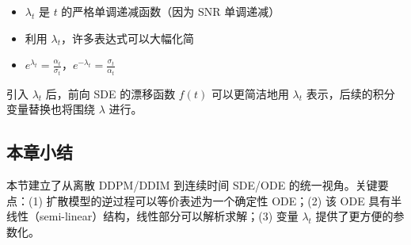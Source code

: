\begin{itemize}
    \item $\lambda_t$ 是 $t$ 的严格单调递减函数（因为 SNR 单调递减）
    \item 利用 $\lambda_t$，许多表达式可以大幅化简
    \item $e^{\lambda_t} = \frac{\alpha_t}{\sigma_t}$，$e^{-\lambda_t} = \frac{\sigma_t}{\alpha_t}$
\end{itemize}

引入 $\lambda_t$ 后，前向 SDE 的漂移函数 $f(t)$ 可以更简洁地用 $\lambda_t$ 表示，后续的积分变量替换也将围绕 $\lambda$ 进行。

\subsection{本章小结}

本节建立了从离散 DDPM/DDIM 到连续时间 SDE/ODE 的统一视角。关键要点：(1) 扩散模型的逆过程可以等价表述为一个确定性 ODE；(2) 该 ODE 具有半线性（semi-linear）结构，线性部分可以解析求解；(3) 变量 $\lambda_t$ 提供了更方便的参数化。


